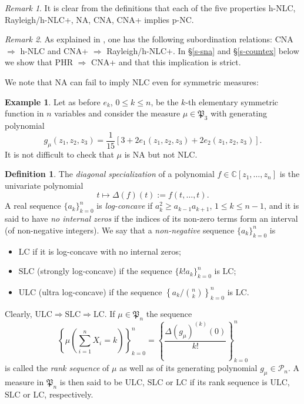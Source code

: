 \documentclass[10pt,reqno]{amsart}
\theoremstyle{plain}
\theoremstyle{definition}
\newtheorem{definition}{Definition}[section]
\newtheorem{example}{Example}[section]
\theoremstyle{remark}
\newtheorem{remark}{Remark}[section]
\newcommand{\LC}{\text{LC}}
\newcommand{\SLC}{\text{SLC}}
\newcommand{\PP}{\mathcal{P}}
\newcommand{\ULC}{\text{ULC}}
\newcommand{\CC}{\mathbb{C}}
\newcommand{\De}{\Delta}
\newcommand{\fP}{\mathfrak{P}}
\begin{document}
\begin{remark}\label{r-pair}
It is clear from the definitions
that each of the five properties h-NLC, Rayleigh/h-NLC+, NA, CNA, CNA+ implies 
p-NC.
\end{remark}

\begin{remark}\label{r-cn-hn}
As explained in \cite{P}, one has the following subordination relations: 
CNA $\Rightarrow$ h-NLC and CNA+ $\Rightarrow$ Rayleigh/h-NLC+. In 
\S \ref{s-sna} and \S \ref{s-countex} below we show that PHR 
$\Rightarrow$ CNA+ and that this implication is strict.
\end{remark}

We note that NA can fail to imply NLC even for symmetric measures:

\begin{example}\label{ex2}
Let as before $e_k$, $0\le k\le n$, be the $k$-th elementary symmetric function
in $n$ variables and consider the measure $\mu\in\fP_3$ with 
generating polynomial
$$
g_\mu(z_1,z_2,z_3)=\frac{1}{15}\left[3+2e_1(z_1,z_2,z_3)+2e_2(z_1,z_2,z_3)
\right].
$$
It is not difficult to check that $\mu$ is NA but not NLC.
\end{example}

\begin{definition}\label{d-ulc}
The {\em diagonal 
specialization} of a polynomial $f\in\CC[z_1,\ldots,z_n]$ is the univariate 
polynomial 
$$t\mapsto\De(f)(t):=f(t,\ldots,t).$$
A real sequence $\{a_k\}_{k=0}^n$ is {\em log-concave} 
if $a_k^2 \geq a_{k-1}a_{k+1}$, $1\leq k \leq n-1$, and it is said to have
{\em no internal zeros} if the indices of its non-zero terms form an interval
(of non-negative integers). 
We say that a 
{\em non-negative} sequence $\{a_k\}_{k=0}^n$ is
\begin{itemize}
\item $\LC$ if it is log-concave with no internal zeros; 
\item $\SLC$ (strongly log-concave) if the sequence 
$\{k!a_k\}_{k=0}^{n}$ is $\LC$;
\item $\ULC$ (ultra log-concave) if the sequence
$\left\{a_k/\binom{n}{k}\right\}_{k=0}^{n}$ is $\LC$. 
\end{itemize}
Clearly, $\ULC\Rightarrow \SLC\Rightarrow 
\LC$. If $\mu\in\fP_n$ the sequence 
$$\left\{\mu\left(\sum_{i=1}^{n}X_i=k\right)\right\}_{k=0}^{n}
=\left\{\frac{\De(g_\mu)^{(k)}(0)}{k!}\right\}_{k=0}^{n}$$
is called the {\em rank sequence} of $\mu$ as well as of its generating 
polynomial $g_\mu\in\PP_n$. A measure in $\fP_n$ is then said to be $\ULC$,
$\SLC$ or $\LC$ if its rank sequence is $\ULC$,
$\SLC$ or $\LC$, respectively. 
\end{definition}
\end{document}
